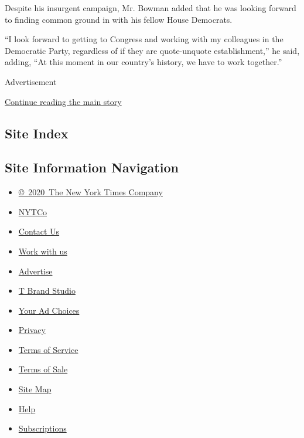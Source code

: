Despite his insurgent campaign, Mr. Bowman added that he was looking
forward to finding common ground in with his fellow House Democrats.

``I look forward to getting to Congress and working with my colleagues
in the Democratic Party, regardless of if they are quote-unquote
establishment,'' he said, adding, ``At this moment in our country's
history, we have to work together.''

Advertisement

\protect\hyperlink{after-bottom}{Continue reading the main story}

\hypertarget{site-index}{%
\subsection{Site Index}\label{site-index}}

\hypertarget{site-information-navigation}{%
\subsection{Site Information
Navigation}\label{site-information-navigation}}

\begin{itemize}
\tightlist
\item
  \href{https://help.nytimes3xbfgragh.onion/hc/en-us/articles/115014792127-Copyright-notice}{©~2020~The
  New York Times Company}
\end{itemize}

\begin{itemize}
\tightlist
\item
  \href{https://www.nytco.com/}{NYTCo}
\item
  \href{https://help.nytimes3xbfgragh.onion/hc/en-us/articles/115015385887-Contact-Us}{Contact
  Us}
\item
  \href{https://www.nytco.com/careers/}{Work with us}
\item
  \href{https://nytmediakit.com/}{Advertise}
\item
  \href{http://www.tbrandstudio.com/}{T Brand Studio}
\item
  \href{https://www.nytimes3xbfgragh.onion/privacy/cookie-policy\#how-do-i-manage-trackers}{Your
  Ad Choices}
\item
  \href{https://www.nytimes3xbfgragh.onion/privacy}{Privacy}
\item
  \href{https://help.nytimes3xbfgragh.onion/hc/en-us/articles/115014893428-Terms-of-service}{Terms
  of Service}
\item
  \href{https://help.nytimes3xbfgragh.onion/hc/en-us/articles/115014893968-Terms-of-sale}{Terms
  of Sale}
\item
  \href{https://spiderbites.nytimes3xbfgragh.onion}{Site Map}
\item
  \href{https://help.nytimes3xbfgragh.onion/hc/en-us}{Help}
\item
  \href{https://www.nytimes3xbfgragh.onion/subscription?campaignId=37WXW}{Subscriptions}
\end{itemize}
